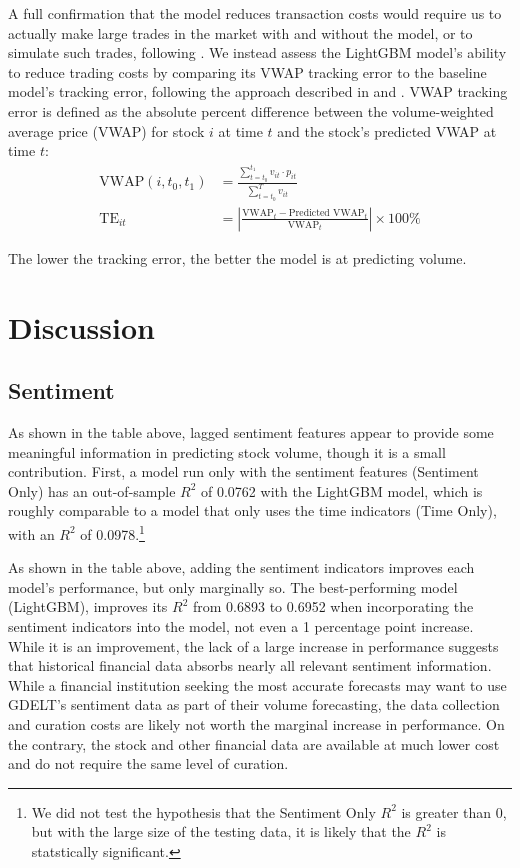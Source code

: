 \documentclass[12pt]{article}
\begin{document}
A full confirmation that the model reduces transaction costs would require us to actually make large trades in the market with and without the model, or to simulate such trades, following \textcite{satish2014predicting}. We instead assess the LightGBM model's ability to reduce trading costs by comparing its VWAP tracking error to the baseline model's tracking error, following the approach described in \textcite{cucuringu2025forecasting} and \textcite{chen2016forecasting}. VWAP tracking error is defined as the absolute percent difference between the volume-weighted average price (VWAP) for stock $i$ at time $t$ and the stock's predicted VWAP at time $t$:
\begin{align}
    \text{VWAP}(i,t_0,t_1) &= \frac{\sum_{t=t_0}^{t_1} v_{it} \cdot p_{it}}{\sum_{t=t_0}^T v_{it}} \\
    \text{TE}_{it} &= \left| \frac{\text{VWAP}_t - \text{Predicted VWAP}_t}{\text{VWAP}_t} \right| \times 100\%
\end{align}

The lower the tracking error, the better the model is at predicting volume.

\newpage
\section{Discussion}
\subsection{Sentiment}
As shown in the table above, lagged sentiment features appear to provide some meaningful information in predicting stock volume, though it is a small contribution. First, a model run only with the sentiment features (Sentiment Only) has an out-of-sample $R^2$ of 0.0762 with the LightGBM model, which is roughly comparable to a model that only uses the time indicators (Time Only), with an $R^2$ of 0.0978.\footnote{We did not test the hypothesis that the Sentiment Only $R^2$ is greater than 0, but with the large size of the testing data, it is likely that the $R^2$ is statstically significant.}

As shown in the table above, adding the sentiment indicators improves each model's performance, but only marginally so. The best-performing model (LightGBM), improves its $R^2$ from 0.6893 to 0.6952 when incorporating the sentiment indicators into the model, not even a 1 percentage point increase. While it is an improvement, the lack of a large increase in performance suggests that historical financial data absorbs nearly all relevant sentiment information. While a financial institution seeking the most accurate forecasts may want to use GDELT's sentiment data as part of their volume forecasting, the data collection and curation costs are likely not worth the marginal increase in performance. On the contrary, the stock and other financial data are available at much lower cost and do not require the same level of curation.
\end{document}
